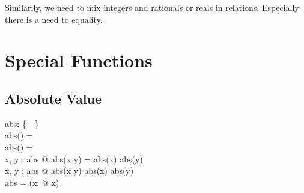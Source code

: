 \documentclass[12pt]{article}
\begin{document}
Similarily, we need to mix integers and rationals or reals in
relations. Especially there is a need to equality.

{}

\section{Special Functions}
\label{sec:special-functions}

\subsection{Absolute Value}
\label{sec:abs}

\begin{axdef}
  abs: \arithmos \pfun \realplus \cup \{~\azero~\}\\
  \where
  abs(\azero) = \azero\\
  abs(\aone) = \aone\\
  \forall x, y : \dom abs @ abs(x \amult y) = abs(x) \amult abs(y)\\
  \forall x, y : \dom abs @ abs(x \aplus y) \aleq abs(x) \aplus
  abs(y)\\
  \real \dres abs = \id \real \oplus (\lambda x: \realminus @ \aneg x)\\
\end{axdef}
\end{document}
